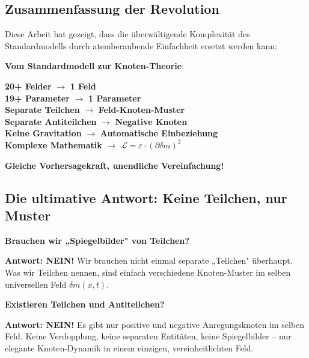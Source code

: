 \documentclass[12pt,a4paper]{article}
\newcommand{\Lag}{\mathcal{L}}
\newcommand{\deltam}{\delta m}
\theoremstyle{definition}
\theoremstyle{remark}
\begin{document}
	\subsection{Zusammenfassung der Revolution}
	
	Diese Arbeit hat gezeigt, dass die überwältigende Komplexität des Standardmodells durch atemberaubende Einfachheit ersetzt werden kann:
	
	\begin{tcolorbox}[colback=green!5!white,colframe=green!75!black,title=Revolutionäre Errungenschaft]
		\textbf{Vom Standardmodell zur Knoten-Theorie}:
		
		\begin{center}
			\textbf{20+ Felder} $\rightarrow$ \textbf{1 Feld} \\[0.5em]
			\textbf{19+ Parameter} $\rightarrow$ \textbf{1 Parameter} \\[0.5em]
			\textbf{Separate Teilchen} $\rightarrow$ \textbf{Feld-Knoten-Muster} \\[0.5em]
			\textbf{Separate Antiteilchen} $\rightarrow$ \textbf{Negative Knoten} \\[0.5em]
			\textbf{Keine Gravitation} $\rightarrow$ \textbf{Automatische Einbeziehung} \\[0.5em]
			\textbf{Komplexe Mathematik} $\rightarrow$ \textbf{$\Lag = \varepsilon \cdot (\partial \deltam)^2$}
		\end{center}
		
		\textbf{Gleiche Vorhersagekraft, unendliche Vereinfachung!}
	\end{tcolorbox}
	
	\subsection{Die ultimative Antwort: Keine Teilchen, nur Muster}
	
	\textbf{Brauchen wir „Spiegelbilder" von Teilchen?}
	
	\textbf{Antwort: NEIN!} Wir brauchen nicht einmal separate „Teilchen" überhaupt. Was wir Teilchen nennen, sind einfach verschiedene Knoten-Muster im selben universellen Feld $\deltam(x,t)$.
	
	\textbf{Existieren Teilchen und Antiteilchen?}
	
	\textbf{Antwort: NEIN!} Es gibt nur positive und negative Anregungsknoten im selben Feld. Keine Verdopplung, keine separaten Entitäten, keine Spiegelbilder -- nur elegante Knoten-Dynamik in einem einzigen, vereinheitlichten Feld.
	
\end{document}

